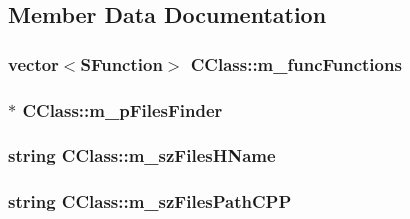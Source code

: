 \subsection{Member Data Documentation}
\hypertarget{class_c_class_a1468409456184a03f237f28f6004a514}{
\subsubsection[{m\+\_\+func\+Functions}]{\setlength{\rightskip}{0pt plus 5cm}vector$<${\bf S\+Function}$>$ C\+Class\+::m\+\_\+func\+Functions\hspace{0.3cm}{\ttfamily [private]}}}\label{class_c_class_a1468409456184a03f237f28f6004a514}
\hypertarget{class_c_class_a253ea247276cd6daeed278c17bebd67a}{
\subsubsection[{m\+\_\+p\+Files\+Finder}]{$\ast$ C\+Class\+::m\+\_\+p\+Files\+Finder\hspace{0.3cm}{\ttfamily [private]}}}\label{class_c_class_a253ea247276cd6daeed278c17bebd67a}
\hypertarget{class_c_class_a15cee6cfe5a893a807799fb33d53db99}{
\subsubsection[{m\+\_\+sz\+Files\+H\+Name}]{\setlength{\rightskip}{0pt plus 5cm}string C\+Class\+::m\+\_\+sz\+Files\+H\+Name}}\label{class_c_class_a15cee6cfe5a893a807799fb33d53db99}
\hypertarget{class_c_class_a684985105ee38e9face97c886bcb86ce}{
\subsubsection[{m\+\_\+sz\+Files\+Path\+C\+P\+P}]{\setlength{\rightskip}{0pt plus 5cm}string C\+Class\+::m\+\_\+sz\+Files\+Path\+C\+P\+P}}\label{class_c_class_a684985105ee38e9face97c886bcb86ce}
